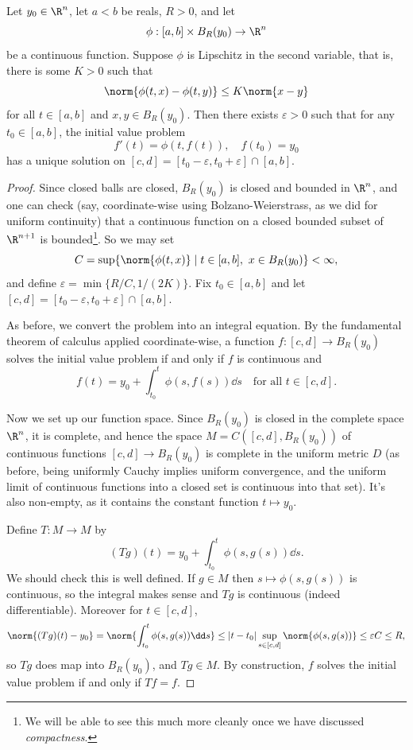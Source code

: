 \begin{theorem}
    Let $y_0 \in \R^n$, let $a < b$ be reals, $R > 0$, and let
    $$
    \phi: [a, b] \times B_R(y_0) \rightarrow \R^n
    $$
    be a continuous function. Suppose $\phi$ is Lipschitz in the second variable, that is, there is some $K > 0$ such that
    $$
    \norm{\phi(t, x) - \phi(t, y)} \leq K \norm{x - y}
    $$
    for all $t \in [a, b]$ and $x, y \in B_R(y_0)$. Then there exists $\varepsilon > 0$ such that for any $t_0 \in [a, b]$, the initial value problem
    $$
    f'(t) = \phi(t, f(t)), \quad f(t_0) = y_0
    $$
    has a unique solution on $[c, d] = [t_0 - \varepsilon, t_0 + \varepsilon] \cap [a, b]$.
\end{theorem}
\begin{proof}
    Since closed balls are closed, $B_R(y_0)$ is closed and bounded in $\R^n$, and one can check (say, coordinate-wise using Bolzano-Weierstrass, as we did for uniform continuity) that a continuous function on a closed bounded subset of $\R^{n+1}$ is bounded\footnote{We will be able to see this much more cleanly once we have discussed \emph{compactness}.}. So we may set
    $$
    C = \sup\{\norm{\phi(t, x)} \mid t \in [a, b],\ x \in B_R(y_0)\} < \infty,
    $$
    and define $\varepsilon = \min\{R/C, 1/(2K)\}$. Fix $t_0 \in [a, b]$ and let $[c, d] = [t_0 - \varepsilon, t_0 + \varepsilon] \cap [a, b]$.

    As before, we convert the problem into an integral equation. By the fundamental theorem of calculus applied coordinate-wise, a function $f: [c, d] \rightarrow B_R(y_0)$ solves the initial value problem if and only if $f$ is continuous and
    $$
    f(t) = y_0 + \int_{t_0}^t \phi(s, f(s)) \dd s \quad \text{for all } t \in [c, d].
    $$

    Now we set up our function space. Since $B_R(y_0)$ is closed in the complete space $\R^n$, it is complete, and hence the space $M = C([c, d], B_R(y_0))$ of continuous functions $[c, d] \rightarrow B_R(y_0)$ is complete in the uniform metric $D$ (as before, being uniformly Cauchy implies uniform convergence, and the uniform limit of continuous functions into a closed set is continuous into that set). It's also non-empty, as it contains the constant function $t \mapsto y_0$.

    Define $T: M \rightarrow M$ by
    $$
    (Tg)(t) = y_0 + \int_{t_0}^t \phi(s, g(s)) \dd s.
    $$
    We should check this is well defined. If $g \in M$ then $s \mapsto \phi(s, g(s))$ is continuous, so the integral makes sense and $Tg$ is continuous (indeed differentiable). Moreover for $t \in [c, d]$,
    $$
    \norm{(Tg)(t) - y_0} = \norm{\int_{t_0}^t \phi(s, g(s)) \dd s} \leq |t - t_0| \sup_{s \in [c,d]} \norm{\phi(s, g(s))} \leq \varepsilon C \leq R,
    $$
    so $Tg$ does map into $B_R(y_0)$, and $Tg \in M$. By construction, $f$ solves the initial value problem if and only if $Tf = f$.


\end{proof}
